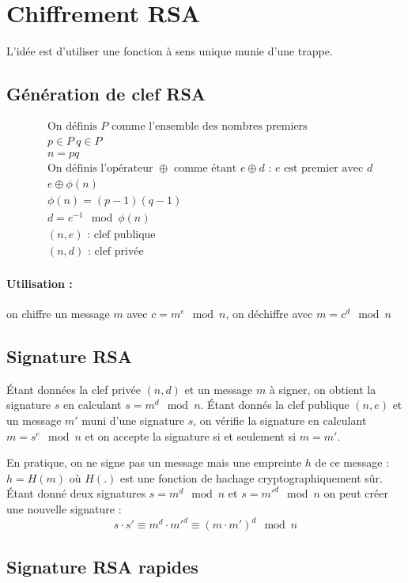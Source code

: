\documentclass[11pt,a4paper]{report}
\begin{document}
\section{Chiffrement RSA}

L'idée est d'utiliser une fonction à sens unique munie d'une trappe.

\subsection{Génération de clef RSA}
\begin{align*}
& \text{On définis $P$ comme l'ensemble des nombres premiers} \\
& p \in P \ q \in P \\
& n = pq \\
& \text{On définis l'opérateur $\oplus$ comme étant $e \oplus d$ : $e$ est premier avec $d$}\\
& e \oplus \phi(n) \\
& \phi(n) = (p-1)(q-1)\\
& d = e^{-1} \mod \phi(n)\\
& (n,e) \text{ : clef publique}\\
& (n,d) \text{ : clef privée}
\end{align*}

\paragraph*{Utilisation : } on chiffre un message $m$ avec $c=m^e\mod n$, on déchiffre avec $m =c^d\mod n$

\subsection{Signature RSA}

Étant données la clef privée $(n,d)$ et un message $m$ à signer, on obtient la signature $s$ en calculant $s=m^d\mod n$. Étant donnés la clef publique $(n,e)$ et un message $m'$ muni d'une signature $s$, on vérifie la signature en calculant $m=s^e\mod n$ et on accepte la signature si et seulement si $m=m'$.

En pratique, on ne signe pas un message mais une empreinte $h$ de ce message : $h=H(m)$ où $H(.)$ est une fonction de hachage cryptographiquement sûr. Étant donné deux signatures $s=m^d\mod n$ et $s=m'^d\mod n$ on peut créer une nouvelle signature :
$$
s \cdot s' \equiv m^d \cdot m'^d \equiv (m\cdot m')^d \mod n 
$$

\subsection{Signature RSA rapides}
\end{document}
